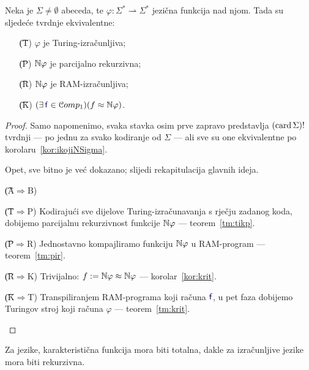 \begin{teorem}
Neka je $\Sigma\not=\emptyset$ abeceda, te $\varphi\colon\Sigma^*\rightharpoonup\Sigma^*$ jezična funkcija nad njom. Tada su sljedeće tvrdnje ekvivalentne:
\begin{itemize}
    \item[\t{(T)}] $\varphi$ je Turing-izračunljiva;
    \item[\t{(P)}] ${\mathbb N}\varphi$ je parcijalno rekurzivna;
    \item[\t{(R)}] ${\mathbb N}\varphi$ je RAM-izračunljiva;
    \item[\t{(K)}] $(\exists\,\f f\in\mathcal Comp_1)(f\approx\N\varphi)$.
\end{itemize}
\end{teorem}
\begin{proof}
Samo napomenimo, svaka stavka osim prve zapravo predstavlja $(\operatorname{card}\Sigma)!$ tvrdnji --- po jednu za svako kodiranje od $\Sigma$ --- ali sve su one ekvivalentne po korolaru~\ref{kor:ikojiNSigma}.

Opet, sve bitno je već dokazano; slijedi rekapitulacija glavnih ideja.
\begin{labeling}{\t{(A$\Rightarrow$B)}}
\item[\t{(T$\Rightarrow$P)}] Kodirajući sve dijelove Turing-izračunavanja s rječju zadanog koda, dobijemo parcijalnu rekurzivnost funkcije ${\mathbb N}\varphi$ --- teorem~\ref{tm:tikp}.
\item[\t{(P$\Rightarrow$R)}] Jednostavno kompajliramo funkciju ${\mathbb N}\varphi$ u RAM-program --- teorem~\ref{tm:pir}.
\item[\t{(R$\Rightarrow$K)}] Trivijalno: $f:={\mathbb N}\varphi\approx{\mathbb N}\varphi$ --- korolar~\ref{kor:krit}.
\item[\t{(K$\Rightarrow$T)}] Transpiliranjem RAM-programa koji računa $\f f$, u pet faza dobijemo Turingov stroj koji računa $\varphi$ --- teorem~\ref{tm:krit}.\qedhere
\end{labeling}
\end{proof}

Za jezike, karakteristična funkcija mora biti totalna, dakle za izračunljive jezike mora biti rekurzivna.

